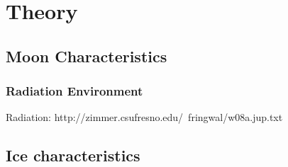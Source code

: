 \chapter{Theory}

\section{Moon Characteristics} %

\subsection{Radiation Environment} \label{chap:radiation}%


Radiation: http://zimmer.csufresno.edu/~fringwal/w08a.jup.txt


\section{Ice characteristics}

